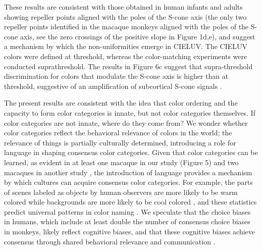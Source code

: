 These results are consistent with those obtained in human infants \citep{skelton_biological_2017} and adults \citep{bae_why_2015,panichello_error-correcting_2019} showing repeller points aligned with the poles of the S-cone axis (the only two repeller points identified in the macaque monkeys aligned with the poles of the S-cone axis, see the zero crossings of the positive slope in Figure 1d,e), and suggest a mechanism by which the non-uniformities emerge in CIELUV. 
The CIELUV colors were defined at threshold, whereas the color-matching experiments were conducted suprathreshold. 
The results in Figure 6c suggest that supra-threshold discrimination for colors that modulate the S-cone axis is higher than at threshold, suggestive of an amplification of subcortical S-cone signals \citep{RN655}. 

The present results are consistent with the idea that color ordering and the capacity to form color categories is innate, but not color categories themselves. 
If color categories are not innate, where do they come from? We wonder whether color categories reflect the behavioral relevance of colors in the world; the relevance of things is partially culturally determined, introducing a role for language in shaping consensus color categories. 
Given that color categories can be learned, as evident in at least one macaque in our study (Figure 5) and two macaques in another study \citep{panichello_error-correcting_2019}, the introduction of language provides a mechanism by which cultures can acquire consensus color categories. 
For example, the parts of scenes labeled as objects by human observers are more likely to be warm colored while backgrounds are more likely to be cool colored \citep{rosenthal_color_2018}, and these statistics predict universal patterns in color naming \citep{gibson_color_2017}. 
We speculate that the choice biases in humans, which include at least double the number of consensus choice biases in monkeys, likely reflect cognitive biases, and that these cognitive biases achieve consensus through shared behavioral relevance and communication \citep{RN18511,RN18514,RN18602}. 
